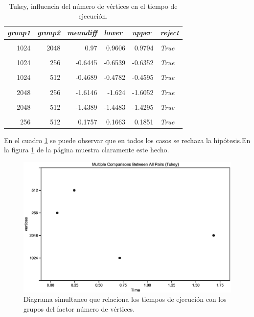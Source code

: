 \documentclass{article}
\begin{document}
\begin{table}[htbp]
  \centering
  \caption{Tukey, influencia del número de vértices en el tiempo de ejecución.}
    \begin{tabular}{rrrrrl}
    \toprule
    \multicolumn{1}{l}{\textit{\textbf{group1}}} & \multicolumn{1}{l}{\textit{\textbf{group2}}} & \multicolumn{1}{l}{\textit{\textbf{meandiff}}} & \multicolumn{1}{l}{\textit{\textbf{lower}}} & \multicolumn{1}{l}{\textit{\textbf{upper}}} & \textit{\textbf{reject}} \\
    \midrule
          &       &       &       &       &  \\
    1024  & 2048  & 0.97  & 0.9606 & 0.9794 & \textit{True} \\
          &       &       &       &       &  \\
    1024  & 256   & -0.6445 & -0.6539 & -0.6352 & \textit{True} \\
          &       &       &       &       &  \\
    1024  & 512   & -0.4689 & -0.4782 & -0.4595 & \textit{True} \\
          &       &       &       &       &  \\
    2048  & 256   & -1.6146 & -1.624 & -1.6052 & \textit{True} \\
          &       &       &       &       &  \\
    2048  & 512   & -1.4389 & -1.4483 & -1.4295 & \textit{True} \\
          &       &       &       &       &  \\
    256   & 512   & 0.1757 & 0.1663 & 0.1851 & \textit{True} \\
    \bottomrule
    \end{tabular}%
  \label{tab:t5}%
\end{table}%

En el cuadro \ref{tab:t5} se puede observar que en todos los casos se rechaza la hipótesis.En la figura \ref{fig7} de la página \pageref{fig7} muestra claramente este hecho.
\begin{center}
\begin{figure}[htbp]
\includegraphics[scale=0.6,width=\textwidth, trim=0 0 0 20, clip=true]{simultaneoustukeyvertices.eps}
\caption{Diagrama simultaneo que relaciona los tiempos de ejecución con los grupos del factor número de vértices.}
\label{fig7}
\end{figure}
\end{center}
\end{document}
